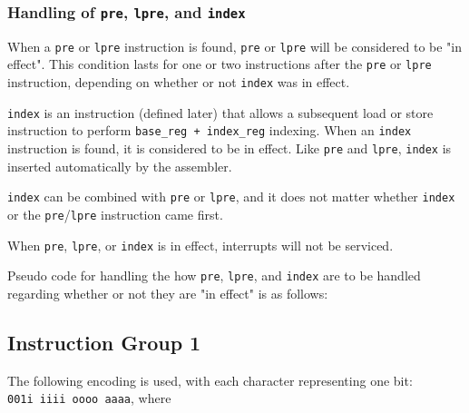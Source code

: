 \documentclass{article}
\begin{document}
	\subsubsection{Handling of \texttt{pre}, \texttt{lpre}, and
	\texttt{index}}

	When a \texttt{pre} or \texttt{lpre} instruction is found, \texttt{pre}
	or \texttt{lpre} will be considered to be "in effect".  This condition
	lasts for one or two instructions after the \texttt{pre} or
	\texttt{lpre} instruction, depending on whether or not \texttt{index}
	was in effect.

	\texttt{index} is an instruction (defined later) that allows a
	subsequent load or store instruction to perform \texttt{base\_reg +
	index\_reg} indexing.  When an \texttt{index} instruction is found, it
	is considered to be in effect.  Like \texttt{pre} and \texttt{lpre},
	\texttt{index} is inserted automatically by the assembler.

	\texttt{index} can be combined with \texttt{pre} or \texttt{lpre}, and
	it does not matter whether \texttt{index} or the
	\texttt{pre}/\texttt{lpre} instruction came first.



	When \texttt{pre}, \texttt{lpre}, or \texttt{index} is in effect,
	interrupts will not be serviced.

	Pseudo code for handling the how \texttt{pre}, \texttt{lpre}, and
	\texttt{index} are to be handled regarding whether or not they are "in
	effect" is as follows:




	\subsection{Instruction Group 1}
	The following encoding is used, with each character representing one
	bit:  \\
	\texttt{001i iiii oooo aaaa}, where
\end{document}
